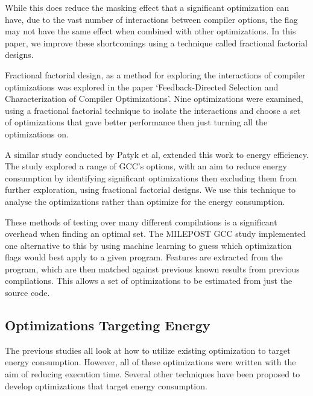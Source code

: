 \documentclass[twocolumn]{article}
\begin{document}

While this does reduce the masking effect that a significant optimization can have, due to the vast number of interactions between compiler options, the flag may not have the same effect when combined with other optimizations. In this paper, we improve these shortcomings using a technique called fractional factorial designs.

Fractional factorial design, as a method for exploring the interactions of compiler optimizations was explored in the paper `Feedback-Directed Selection and Characterization of Compiler Optimizations'\cite{IntelPaper}. Nine optimizations were examined, using a fractional factorial technique to isolate the interactions and choose a set of optimizations that gave better performance then just turning all the optimizations on.

A similar study conducted by Patyk et al\cite{EnergyReductionCompilerOptions}, extended this work to energy efficiency. The study explored a range of GCC's options, with an aim to reduce energy consumption by identifying significant optimizations then excluding them from further exploration, using fractional factorial designs. We use this technique to analyse the optimizations rather than optimize for the energy consumption.

These methods of testing over many different compilations is a significant overhead when finding an optimal set. The MILEPOST GCC\cite{Fursin2011} study implemented one alternative to this by using machine learning to guess which optimization flags would best apply to a given program. Features are extracted from the program, which are then matched against previous known results from previous compilations. This allows a set of optimizations to be estimated from just the source code.

\subsection{Optimizations Targeting Energy}

The previous studies all look at how to utilize existing optimization to target energy consumption. However, all of these optimizations were written with the aim of reducing execution time. Several other techniques have been proposed to develop optimizations that target energy consumption.
\end{document}
